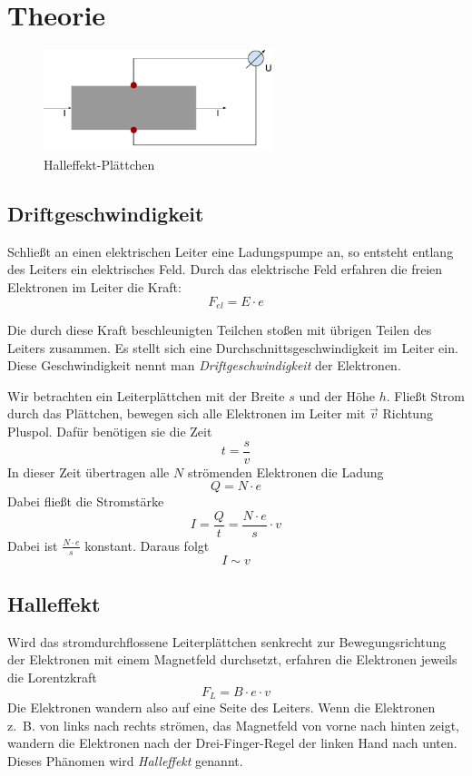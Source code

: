 \chapter{Theorie}
\begin{figure}[H]
\centering
\includegraphics[width=0.6\textwidth]{img/halleffekt_plaettchen.pdf}
\caption{Halleffekt-Plättchen}
\end{figure}

\section{Driftgeschwindigkeit}
Schließt an einen elektrischen Leiter eine Ladungspumpe an, so entsteht entlang des Leiters ein elektrisches Feld. Durch das elektrische Feld erfahren die freien Elektronen im Leiter die Kraft:
$$F_{el} = E \cdot e$$

Die durch diese Kraft beschleunigten Teilchen stoßen mit übrigen Teilen des Leiters zusammen. Es stellt sich eine Durchschnittsgeschwindigkeit im Leiter ein.
Diese Geschwindigkeit nennt man \emph{Driftgeschwindigkeit} der Elektronen.

Wir betrachten ein Leiterplättchen mit der Breite $s$ und der Höhe $h$.
Fließt Strom durch das Plättchen, bewegen sich alle Elektronen im Leiter mit $\vec{v}$ Richtung Pluspol. Dafür benötigen sie die Zeit
$$t = \frac{s}{v}$$
In dieser Zeit übertragen alle $N$ strömenden Elektronen die Ladung 
$$Q = N \cdot e$$ 
Dabei fließt die Stromstärke
$$I = \frac{Q}{t} = \frac{N \cdot e}{s} \cdot v$$
Dabei ist $\frac{N \cdot e}{s}$ konstant. Daraus folgt
$$I \sim v$$

\section{Halleffekt}
Wird das stromdurchflossene Leiterplättchen senkrecht zur Bewegungsrichtung der Elektronen mit einem Magnetfeld durchsetzt, erfahren die Elektronen jeweils die Lorentzkraft
$$F_L = B \cdot e \cdot v$$
Die Elektronen wandern also auf eine Seite des Leiters. Wenn die Elektronen z.~B. von links nach rechts strömen, das Magnetfeld von vorne nach hinten zeigt, wandern die Elektronen nach der Drei-Finger-Regel der linken Hand nach unten. Dieses Phänomen wird \emph{Halleffekt} genannt.

